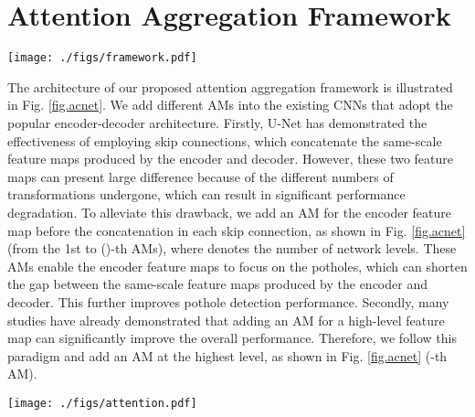 \documentclass[runningheads]{llncs}
\begin{document}
\section{Attention Aggregation Framework}
\label{sec.attention_combination_framework}

\begin{figure*}[t]
    \centering
    \texttt{[image: ./figs/framework.pdf]}
    \caption{The architecture of the proposed attention aggregation framework for our AA-UNet and AA-RTFNet.}
    \label{fig.acnet}
\end{figure*}

The architecture of our proposed attention aggregation framework is illustrated in Fig. \ref{fig.acnet}. We add different AMs into the existing CNNs that adopt the popular encoder-decoder architecture. Firstly, U-Net \cite{ronneberger2015u} has demonstrated the effectiveness of employing skip connections, which concatenate the same-scale feature maps produced by the encoder and decoder. However, these two feature maps can present large difference because of the different numbers of transformations undergone, which can result in significant performance degradation. To alleviate this drawback, we add an AM for the encoder feature map before the concatenation in each skip connection, as shown in Fig. \ref{fig.acnet} (from the 1st to ()-th AMs), where  denotes the number of network levels. These AMs enable the encoder feature maps to focus on the potholes, which can shorten the gap between the same-scale feature maps produced by the encoder and decoder. This further improves pothole detection performance. Secondly, many studies \cite{fu2019dual,huang2019ccnet} have already demonstrated that adding an AM for a high-level feature map can significantly improve the overall performance. Therefore, we follow this paradigm and add an AM at the highest level, as shown in Fig. \ref{fig.acnet} (-th AM).

\begin{figure*}[t]
    \centering
    \texttt{[image: ./figs/attention.pdf]}
    \caption{The illustrations of the three AMs used in our attention aggregation framework.}
    \label{fig.attention}
\end{figure*}
\end{document}
